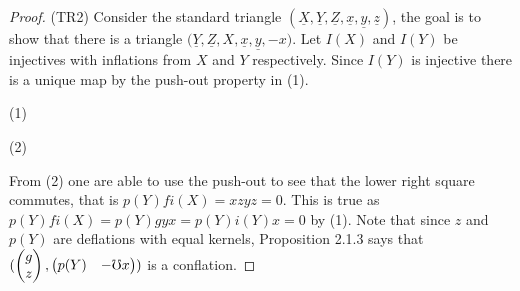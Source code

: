 \begin{proof}
        (TR2) Consider the standard triangle $(\underline{X},\underline{Y},\underline{Z},\underline{x},\underline{y},\underline{z})$, the goal is to show that there is a triangle $(\underline{Y},\underline{Z},$\underline{$X$}$,\underline{x},\underline{y},-$\underline{$x$}$)$. Let $I(X)$ and $I(Y)$ be injectives with inflations from $X$ and $Y$ respectively. Since $I(Y)$ is injective there is a unique map by the push-out property in (1).
        \begin{center}
            (1)
            (2)
        \end{center}
        From (2) one are able to use the push-out to see that the lower right square commutes, that is $p(Y)fi(X)=$$xzyz=0$. This is true as $p(Y)fi(X)=p(Y)gyx=p(Y)i(Y)x=0$ by (1). Note that since $z$ and $p(Y)$ are deflations with equal kernels, Proposition 2.1.3 says that $(\begin{pmatrix}g \\ z\end{pmatrix},\begin{pmatrix}p(Y) & -\rotatebox[origin=c]{180}{$\Omega$}x\end{pmatrix})$ is a conflation. 


\end{proof}
